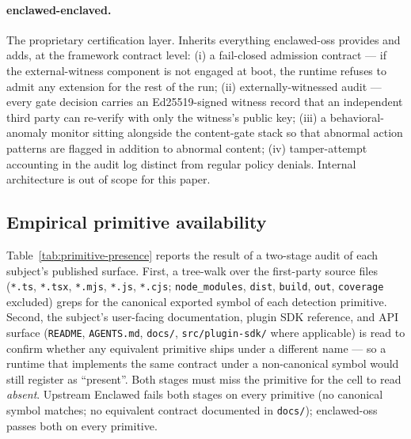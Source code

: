 \documentclass[11pt]{article}
\begin{document}
\paragraph{enclawed-enclaved.} The proprietary certification layer.
Inherits everything enclawed-oss provides and adds, at the framework
contract level: (i) a fail-closed admission contract --- if the
external-witness component is not engaged at boot, the runtime refuses
to admit any extension for the rest of the run; (ii) externally-witnessed
audit --- every gate decision carries an Ed25519-signed witness record
that an independent third party can re-verify with only the witness's
public key; (iii) a behavioral-anomaly monitor sitting alongside the
content-gate stack so that abnormal action patterns are flagged in
addition to abnormal content; (iv) tamper-attempt accounting in the
audit log distinct from regular policy denials. Internal architecture
is out of scope for this paper.

\subsection{Empirical primitive availability}

Table~\ref{tab:primitive-presence} reports the result of a two-stage
audit of each subject's published surface. First, a tree-walk over
the first-party source files (\texttt{*.ts}, \texttt{*.tsx},
\texttt{*.mjs}, \texttt{*.js}, \texttt{*.cjs}; \texttt{node\_modules},
\texttt{dist}, \texttt{build}, \texttt{out}, \texttt{coverage}
excluded) greps for the canonical exported symbol of each detection
primitive. Second, the subject's user-facing documentation, plugin
SDK reference, and API surface (\texttt{README}, \texttt{AGENTS.md},
\texttt{docs/}, \texttt{src/plugin-sdk/} where applicable) is read to
confirm whether any equivalent primitive ships under a different
name --- so a runtime that implements the same contract under a
non-canonical symbol would still register as ``present''. Both
stages must miss the primitive for the cell to read \emph{absent}.
Upstream Enclawed fails both stages on every primitive (no canonical
symbol matches; no equivalent contract documented in
\texttt{docs/}); enclawed-oss passes both on every primitive.
\end{document}
